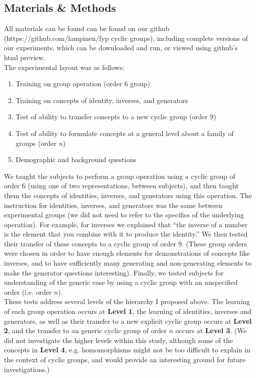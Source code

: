 \documentclass[11pt]{article}
\begin{document}
\subsection{Materials \& Methods} 
All materials can be found can be found on our github (https://github.com/lampinen/fyp cyclic groups), including complete versions of our experiments, which can be downloaded and run, or viewed using github's html preview. \\[11pt]
The experimental layout was as follows:
\begin{enumerate}
\item Training on group operation (order 6 group)
\item Training on concepts of identity, inverses, and generators
\item Test of ability to transfer concepts to a new cyclic group (order 9)
\item Test of ability to formulate concepts at a general level about a family of groups (order $n$)
\item Demographic and background questions
\end{enumerate}
We taught the subjects to perform a group operation using a cyclic group of order 6 (using one of two representations, between subjects), and then taught them the concepts of identities, inverses, and generators using this operation. The instruction for identities, inverses, and generators was the same between experimental groups (we did not need to refer to the specifics of the underlying operation). For example, for inverses we explained that ``the inverse of a number is the element that you combine with it to produce the identity.'' We then tested their transfer of these concepts to a cyclic group of order 9. (These group orders were chosen in order to have enough elements for demonstrations of concepts like inverses, and to have sufficiently many generating and non-generating elements to make the generator questions interesting). Finally, we tested subjects for understanding of the generic case by using a cyclic group with an unspecified order (i.e. order $n$). \\[11pt]
These tests address several levels of the hierarchy I proposed above. The learning of each group operation occurs at \textbf{Level 1}, the learning of identities, inverses and generators, as well as their transfer to a new explicit cyclic group occurs at \textbf{Level 2}, and the transfer to an generic cyclic group of order $n$ occurs at \textbf{Level 3}. (We did not investigate the higher levels within this study, although some of the concepts in \textbf{Level 4}, e.g. homomorphisms might not be too difficult to explain in the context of cyclic groups, and would provide an interesting ground for future investigations.)  
\end{document}
